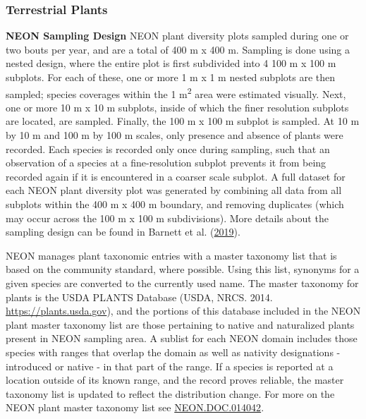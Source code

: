 \documentclass[
  12pt,
]{article}
\begin{document}
\hypertarget{terrestrial-plants}{%
\subsubsection{Terrestrial Plants}\label{terrestrial-plants}}

\textbf{NEON Sampling Design} NEON plant diversity plots sampled during one or two bouts per year, and are a total of 400 m x 400 m. Sampling is done using a nested design, where the entire plot is first subdivided into 4 100 m x 100 m subplots. For each of these, one or more 1 m x 1 m nested subplots are then sampled; species coverages within the 1 m\textsuperscript{2} area were estimated visually. Next, one or more 10 m x 10 m subplots, inside of which the finer resolution subplots are located, are sampled. Finally, the 100 m x 100 m subplot is sampled. At 10 m by 10 m and 100 m by 100 m scales, only presence and absence of plants were recorded. Each species is recorded only once during sampling, such that an observation of a species at a fine-resolution subplot prevents it from being recorded again if it is encountered in a coarser scale subplot. A full dataset for each NEON plant diversity plot was generated by combining all data from all subplots within the 400 m x 400 m boundary, and removing duplicates (which may occur across the 100 m x 100 m subdivisions). More details about the sampling design can be found in Barnett et al. (\protect\hyperlink{ref-barnett2019plant}{2019}).

NEON manages plant taxonomic entries with a master taxonomy list that is based on the community standard, where possible. Using this list, synonyms for a given species are converted to the currently used name. The master taxonomy for plants is the USDA PLANTS Database (USDA, NRCS. 2014. \url{https://plants.usda.gov}), and the portions of this database included in the NEON plant master taxonomy list are those pertaining to native and naturalized plants present in NEON sampling area. A sublist for each NEON domain includes those species with ranges that overlap the domain as well as nativity designations - introduced or native - in that part of the range. If a species is reported at a location outside of its known range, and the record proves reliable, the master taxonomy list is updated to reflect the distribution change. For more on the NEON plant master taxonomy list see \href{https://data.neonscience.org/api/v0/documents/NEON.DOC.014042vK}{NEON.DOC.014042}.
\end{document}
